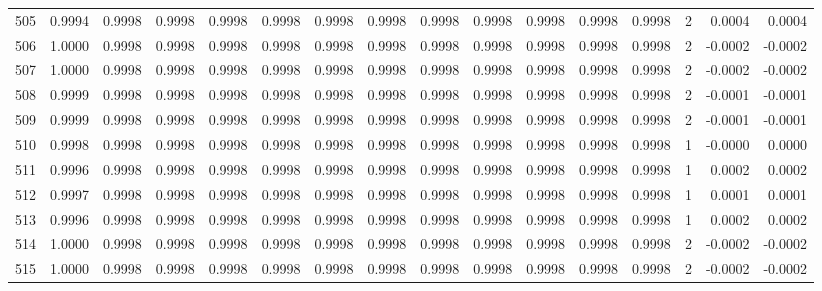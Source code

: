 \begin{tabular}{lrrrrrrrrrrrrrrr}
505 &      0.9994 &  0.9998 &  0.9998 &  0.9998 &  0.9998 &  0.9998 &  0.9998 &  0.9998 &  0.9998 &  0.9998 &   0.9998 &     0.9998 &      2 &                    0.0004 &                     0.0004 \\
506 &      1.0000 &  0.9998 &  0.9998 &  0.9998 &  0.9998 &  0.9998 &  0.9998 &  0.9998 &  0.9998 &  0.9998 &   0.9998 &     0.9998 &      2 &                   -0.0002 &                    -0.0002 \\
507 &      1.0000 &  0.9998 &  0.9998 &  0.9998 &  0.9998 &  0.9998 &  0.9998 &  0.9998 &  0.9998 &  0.9998 &   0.9998 &     0.9998 &      2 &                   -0.0002 &                    -0.0002 \\
508 &      0.9999 &  0.9998 &  0.9998 &  0.9998 &  0.9998 &  0.9998 &  0.9998 &  0.9998 &  0.9998 &  0.9998 &   0.9998 &     0.9998 &      2 &                   -0.0001 &                    -0.0001 \\
509 &      0.9999 &  0.9998 &  0.9998 &  0.9998 &  0.9998 &  0.9998 &  0.9998 &  0.9998 &  0.9998 &  0.9998 &   0.9998 &     0.9998 &      2 &                   -0.0001 &                    -0.0001 \\
510 &      0.9998 &  0.9998 &  0.9998 &  0.9998 &  0.9998 &  0.9998 &  0.9998 &  0.9998 &  0.9998 &  0.9998 &   0.9998 &     0.9998 &      1 &                   -0.0000 &                     0.0000 \\
511 &      0.9996 &  0.9998 &  0.9998 &  0.9998 &  0.9998 &  0.9998 &  0.9998 &  0.9998 &  0.9998 &  0.9998 &   0.9998 &     0.9998 &      1 &                    0.0002 &                     0.0002 \\
512 &      0.9997 &  0.9998 &  0.9998 &  0.9998 &  0.9998 &  0.9998 &  0.9998 &  0.9998 &  0.9998 &  0.9998 &   0.9998 &     0.9998 &      1 &                    0.0001 &                     0.0001 \\
513 &      0.9996 &  0.9998 &  0.9998 &  0.9998 &  0.9998 &  0.9998 &  0.9998 &  0.9998 &  0.9998 &  0.9998 &   0.9998 &     0.9998 &      1 &                    0.0002 &                     0.0002 \\
514 &      1.0000 &  0.9998 &  0.9998 &  0.9998 &  0.9998 &  0.9998 &  0.9998 &  0.9998 &  0.9998 &  0.9998 &   0.9998 &     0.9998 &      2 &                   -0.0002 &                    -0.0002 \\
515 &      1.0000 &  0.9998 &  0.9998 &  0.9998 &  0.9998 &  0.9998 &  0.9998 &  0.9998 &  0.9998 &  0.9998 &   0.9998 &     0.9998 &      2 &                   -0.0002 &                    -0.0002 \\

\end{tabular}
